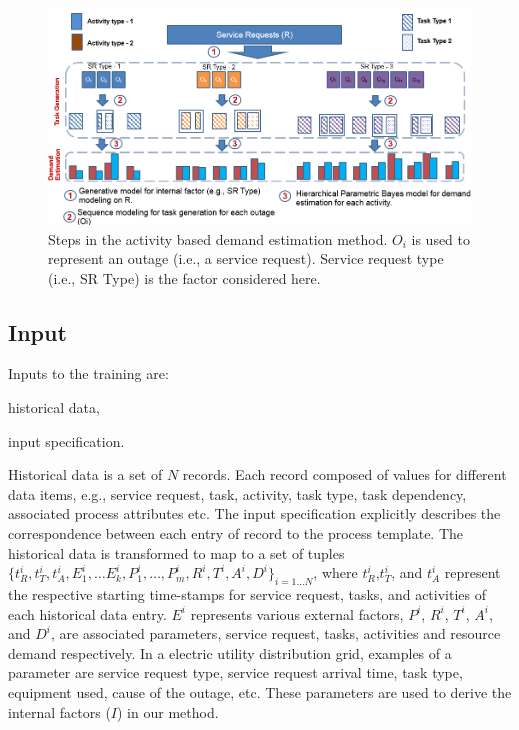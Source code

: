 \documentclass[twoside,leqno,twocolumn]{article}
\begin{document}

\begin{figure}[t]
 \centering
 \includegraphics[width=16cm]{fig2a}
 \caption{Steps in the activity based demand estimation method. $O_i$ is used to represent an outage (i.e., a service request). Service request type (i.e., SR Type) is the factor considered here.}
 \label{fig2a}
\end{figure}

\subsection{Input}\label{subsec:input}
Inputs to the training are:
\begin{enumerate*}
	\item historical data,
	\item input specification.
\end{enumerate*}
 Historical data is a set of $N$ records. Each record composed of values for different data items, e.g., service request, task, activity, task type, task dependency, associated process attributes etc. The input specification explicitly describes the correspondence between each entry of record to the process template. The historical data is transformed to map to a set of tuples ${\lbrace t_{R}^{i}, t_{T}^i, t_{A}^{i}, E_{1}^{i},\dots E_{k}^{i}, P_{1}^{i},\dots,P_{m}^{i}, R^{i}, T^{i}, A^{i}, D^{i} \rbrace }_{i=1 \dots N}$, where $t_{R}^{i}$,$t_{T}^{i}$, and $t_{A}^{i}$ represent the respective starting time-stamps for service request, tasks, and activities of each historical data entry. $E^{i}$ represents various external factors, $P^{i}$, $R^{i}$, $T^{i}$, $A^{i}$, and $D^{i}$, are associated parameters, service request, tasks, activities and resource demand respectively. In a electric utility distribution grid, examples of a parameter are service request type, service request arrival time, task type, equipment used, cause of the outage, etc. These parameters are used to derive the internal factors ($I$) in our method.
\end{document}
